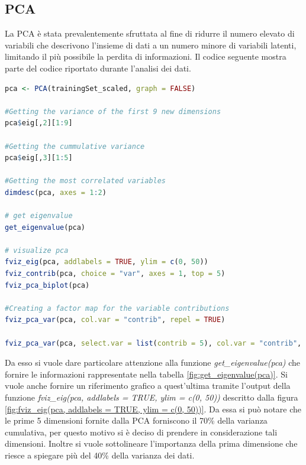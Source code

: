 \documentclass[letterpaper,11pt]{article}
\begin{document}
\subsection{PCA}
La PCA è stata prevalentemente sfruttata al fine di ridurre il numero elevato di variabili che descrivono l'insieme di dati a un numero minore di variabili latenti, limitando il più possibile la perdita di informazioni. Il codice seguente mostra parte del codice riportato durante l'analisi dei dati.
\begin{lstlisting}[language=R]
pca <- PCA(trainingSet_scaled, graph = FALSE)

#Getting the variance of the first 9 new dimensions
pca$eig[,2][1:9]

#Getting the cummulative variance
pca$eig[,3][1:5]

#Getting the most correlated variables
dimdesc(pca, axes = 1:2)

# get eigenvalue
get_eigenvalue(pca)

# visualize pca
fviz_eig(pca, addlabels = TRUE, ylim = c(0, 50))
fviz_contrib(pca, choice = "var", axes = 1, top = 5)
fviz_pca_biplot(pca)

#Creating a factor map for the variable contributions
fviz_pca_var(pca, col.var = "contrib", repel = TRUE)

fviz_pca_var(pca, select.var = list(contrib = 5), col.var = "contrib", repel = TRUE)
\end{lstlisting}
Da esso si vuole dare particolare attenzione alla funzione \textit{get\_eigenvalue(pca)} che fornire le informazioni rappresentate nella tabella \ref{fig:get_eigenvalue(pca)}. Si vuole anche fornire un riferimento grafico a quest'ultima tramite l'output della funzione \textit{fviz\_eig(pca, addlabels = TRUE, ylim = c(0, 50))} descritto dalla figura \ref{fig:fviz_eig(pca, addlabels = TRUE, ylim = c(0, 50))}. Da essa si può notare che le prime 5 dimensioni fornite dalla PCA forniscono il 70\% della varianza cumulativa, per questo motivo si è deciso di prendere in considerazione tali dimensioni. Inoltre si vuole sottolineare l'importanza della prima dimensione che riesce a spiegare più del 40\% della varianza dei dati.
\end{document}
